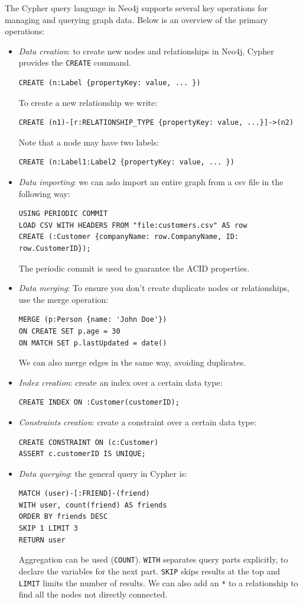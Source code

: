The Cypher query language in Neo4j supports several key operations for managing and querying graph data. 
Below is an overview of the primary operations:
\begin{itemize}
    \item \textit{Data creation}: to create new nodes and relationships in Neo4j, Cypher provides the \texttt{CREATE} command.
        \begin{verbatim}
CREATE (n:Label {propertyKey: value, ... })
        \end{verbatim}
        To create a new relationship we write: 
        \begin{verbatim}
CREATE (n1)-[r:RELATIONSHIP_TYPE {propertyKey: value, ...}]->(n2)
        \end{verbatim}
        Note that a node may have two labels: 
        \begin{verbatim}
CREATE (n:Label1:Label2 {propertyKey: value, ... })
        \end{verbatim}
    \item \textit{Data importing}: we can aslo import an entire graph from a csv file in the following way: 
        \begin{verbatim}
USING PERIODIC COMMIT 
LOAD CSV WITH HEADERS FROM "file:customers.csv" AS row
CREATE (:Customer {companyName: row.CompanyName, ID: row.CustomerID}); 
        \end{verbatim}
        The periodic commit is used to guarantee the ACID properties. 
    \item \textit{Data merging}: To ensure you don't create duplicate nodes or relationships, use the merge operation: 
        \begin{verbatim}
MERGE (p:Person {name: 'John Doe'})
ON CREATE SET p.age = 30
ON MATCH SET p.lastUpdated = date()  
        \end{verbatim}
        We can also merge edges in the same way, avoiding duplicates. 
    \item \textit{Index creation}: create an index over a certain data type: 
        \begin{verbatim}
CREATE INDEX ON :Customer(customerID);
        \end{verbatim}
    \item \textit{Constraints creation}: create a constraint over a certain data type: 
        \begin{verbatim}
CREATE CONSTRAINT ON (c:Customer)
ASSERT c.customerID IS UNIQUE;
        \end{verbatim}
    \item \textit{Data querying}: the general query in Cypher is: 
        \begin{verbatim}
MATCH (user)-[:FRIEND]-(friend)
WITH user, count(friend) AS friends
ORDER BY friends DESC
SKIP 1 LIMIT 3
RETURN user
        \end{verbatim}
        Aggregation can be used (\texttt{COUNT}).
        \texttt{WITH} separates query parts explicitly, to declare the variables for the next part.
        \texttt{SKIP} skips results at the top and \texttt{LIMIT} limits the number of results.
        We can also add an \texttt{*} to a relationship to find all the nodes not directly connected. 
\end{itemize}